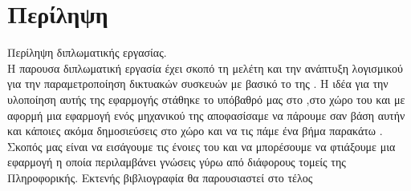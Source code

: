 \chapter*{Περίληψη}

Περίληψη διπλωματικής εργασίας.\\

\noindent H παρουσα διπλωματική εργασία έχει σκοπό τη μελέτη και την ανάπτυξη λογισμικού
για την παραμετροποίηση δικτυακών συσκευών με βασικό  το  της .
Η ιδέα για την υλοποίηση αυτής της εφαρμογής στάθηκε το υπόβαθρό μας στο 
,στο χώρο του  και με αφορμή μια εφαρμογή ενός μηχανικού της  αποφασίσαμε να πάρουμε σαν βάση
αυτήν και κάποιες ακόμα δημοσιεύσεις στο χώρο και να τις πάμε ένα βήμα παρακάτω
. Σκοπός μας είναι να εισάγουμε τις ένοιες του    
και να μπορέσουμε να φτιάξουμε μια εφαρμογή η οποία περιλαμβάνει γνώσεις γύρω από διάφορους τομείς της Πληροφορικής.
Εκτενής βιβλιογραφία θα παρουσιαστεί στο τέλος

